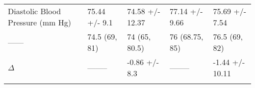 \documentclass[]{article}
\begin{document}
\begin{longtable}[]{@{}lllll@{}}
\begin{minipage}[t]{0.15\columnwidth}\raggedright
Diastolic Blood Pressure (mm Hg)\strut
\end{minipage} & \begin{minipage}[t]{0.20\columnwidth}\raggedright
75.44 +/- 9.1\strut
\end{minipage} & \begin{minipage}[t]{0.18\columnwidth}\raggedright
74.58 +/- 12.37\strut
\end{minipage} & \begin{minipage}[t]{0.18\columnwidth}\raggedright
77.14 +/- 9.66\strut
\end{minipage} & \begin{minipage}[t]{0.15\columnwidth}\raggedright
75.69 +/- 7.54\strut
\end{minipage}\tabularnewline
\begin{minipage}[t]{0.15\columnwidth}\raggedright
------\strut
\end{minipage} & \begin{minipage}[t]{0.20\columnwidth}\raggedright
74.5 (69, 81)\strut
\end{minipage} & \begin{minipage}[t]{0.18\columnwidth}\raggedright
74 (65, 80.5)\strut
\end{minipage} & \begin{minipage}[t]{0.18\columnwidth}\raggedright
76 (68.75, 85)\strut
\end{minipage} & \begin{minipage}[t]{0.15\columnwidth}\raggedright
76.5 (69, 82)\strut
\end{minipage}\tabularnewline
\begin{minipage}[t]{0.15\columnwidth}\raggedright
\(\Delta\)\strut
\end{minipage} & \begin{minipage}[t]{0.20\columnwidth}\raggedright
--------\strut
\end{minipage} & \begin{minipage}[t]{0.18\columnwidth}\raggedright
-0.86 +/- 8.3\strut
\end{minipage} & \begin{minipage}[t]{0.18\columnwidth}\raggedright
--------\strut
\end{minipage} & \begin{minipage}[t]{0.15\columnwidth}\raggedright
-1.44 +/- 10.11\strut
\end{minipage}\tabularnewline
\begin{minipage}[t]{0.15\columnwidth}\raggedright

\end{minipage}
\end{longtable}
\end{document}
